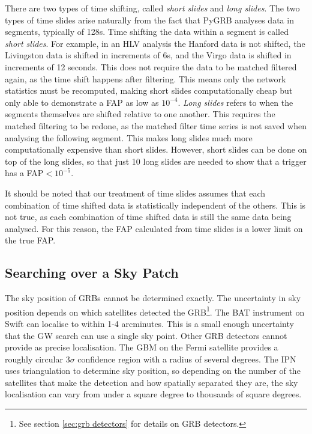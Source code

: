 \documentclass[11pt]{cuthesis}
\begin{document}
There are two types of time shifting, called \textit{short slides} and \textit{long slides}. The two types of time slides arise naturally from the fact that PyGRB analyses data in segments, typically of 128s. Time shifting the data within a segment is called \textit{short slides}. For example, in an HLV analysis the Hanford data is not shifted, the Livingston data is shifted in increments of 6s, and the Virgo data is shifted in increments of 12 seconds. This does not require the data to be matched filtered again, as the time shift happens after filtering. This means only the network statistics must be recomputed, making short slides computationally cheap but only able to demonstrate a FAP as low as $10^{-4}$. \textit{Long slides} refers to when the segments themselves are shifted relative to one another. This requires the matched filtering to be redone, as the matched filter time series is not saved when analysing the following segment. This makes long slides much more computationally expensive than short slides. However, short slides can be done on top of the long slides, so that just 10 long slides are needed to show that a trigger has a FAP$<10^{-5}$.

It should be noted that our treatment of time slides assumes that each combination of time shifted data is statistically independent of the others. This is not true, as each combination of time shifted data is still the same data being analysed. For this reason, the FAP calculated from time slides is a lower limit on the true FAP. \cite{was_2009,was_2010}


\subsection{Searching over a Sky Patch} \label{sec:sky grid}
The sky position of GRBs cannot be determined exactly. The uncertainty in sky position depends on which satellites detected the GRB\footnote{See section \ref{sec:grb detectors} for details on GRB detectors.}. The BAT instrument on Swift can localise to within 1-4 arcminutes. \cite{swift_loc} This is a small enough uncertainty that the GW search can use a single sky point. \cite{gw_loc} Other GRB detectors cannot provide as precise localisation. The GBM on the Fermi satellite provides a roughly circular 3$\sigma$ confidence region with a radius of several degrees. \cite{fermi_loc} The IPN uses triangulation to determine sky position, so depending on the number of the satellites that make the detection and how spatially separated they are, the sky localisation can vary from under a square degree to thousands of square degrees. 
\end{document}
